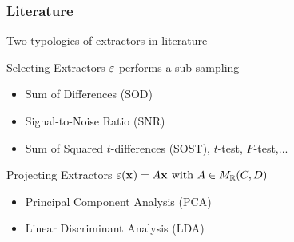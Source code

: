 \begin{frame}
\frametitle{Literature}
Two typologies of extractors in literature
\begin{block}{Selecting Extractors}
$\extract$ performs a sub-sampling
\begin{itemize}
\item Sum of Differences (SOD) \cite{Chari2003}
\item Signal-to-Noise Ratio (SNR) \cite{mangard2008power}
\item Sum of Squared $t$-differences (SOST), $t$-test, $F$-test,... \cite{gierlichs2006templates,bar2010improved,choudary2014efficient}
\end{itemize}
\end{block}

\begin{block}{Projecting Extractors}
$\extract(\sss[]{}) = A\sss[]{} \mbox{ with } A \in M_{\mathbb{R}}(\newTraceLength, \traceLength)$
\begin{itemize}
\item Principal Component Analysis (PCA) \cite{TAprincipal,Batina2012}
\item Linear Discriminant Analysis (LDA) \cite{Standaert2008,lessIsMore}
\end{itemize}
\end{block}

\end{frame}

